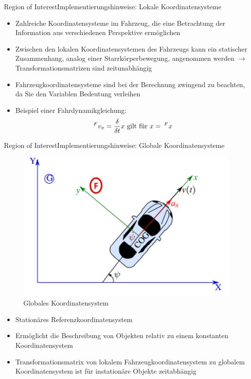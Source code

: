 \documentclass[169, handout	]{THIbeamer} %
\begin{document}
	\begin{frame}{Region of Interest}{Implementierungshinweise: Lokale Koordinatensysteme}
		\begin{itemize}
			\item Zahlreiche Koordinatensysteme im Fahrzeug, die eine Betrachtung der Information aus verschiedenen Perspektive ermöglichen
			\item Zwischen den lokalen Koordinatensystemen des Fahrzeugs kann ein statischer Zusammenhang, analog einer Starrkörperbewegung, angenommen werden $\rightarrow$ Transformationsmatrizen sind zeitunabhängig
			\item Fahrzeugkoordinatensysteme sind bei der Berechnung zwingend zu beachten, da Sie den Variablen Bedeutung verleihen
			\item Beispiel einer Fahrdynamikgleichung:
			\begin{equation}
				\hspace*{0.2em}^F\vspace*{-0.2em}v_{x} = \frac{\delta}{\delta t}x \text{ gilt für } x =\hspace*{0.2em}^F\vspace*{-0.2em}x
			\end{equation}
					
		\end{itemize}
	\end{frame}
	\begin{frame}{Region of Interest}{Implementierungshinweise: Globale Koordinatensysteme}	
		\begin{figure}
			\includegraphics[scale=0.35]{required/Globales Koordinatensystem.jpg}
			\caption{Globales Koordinatensystem}
        	\label{Globales Koordinatensystem}
		\end{figure}
		\begin{itemize}
			\item Stationäres Referenzkoordinatensystem
			\item Ermöglicht die Beschreibung von Objekten relativ zu einem konstanten Koordinatensystem
			\item Transformationsmatrix von lokalem Fahrzeugkoordinatensystem zu globalem Koordinatensystem ist für instationäre Objekte zeitabhängig
		\end{itemize}					
	\end{frame}
\end{document}
